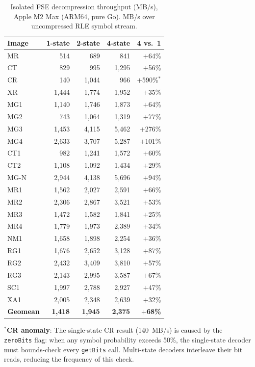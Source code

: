 \documentclass[journal]{IEEEtran}
\begin{document}
\begin{table}[htbp]
\centering
\caption{Isolated FSE decompression throughput (MB/s), Apple M2 Max (ARM64,
pure Go). MB/s over uncompressed RLE symbol stream.}
\label{tab:fse-arm64}
\scriptsize
\begin{tabular}{lrrrr}
\toprule
Image & 1-state & 2-state & 4-state & 4 vs.\ 1 \\
\midrule
MR   &   514 &   689 &   841 & $+$64\% \\
CT   &   829 &   995 & 1,295 & $+$56\% \\
CR   &   140 & 1,044 &   966 & $+$590\%$^*$ \\
XR   & 1,444 & 1,774 & 1,952 & $+$35\% \\
MG1  & 1,140 & 1,746 & 1,873 & $+$64\% \\
MG2  &   743 & 1,064 & 1,319 & $+$77\% \\
MG3  & 1,453 & 4,115 & 5,462 & $+$276\% \\
MG4  & 2,633 & 3,707 & 5,287 & $+$101\% \\
CT1  &   982 & 1,241 & 1,572 & $+$60\% \\
CT2  & 1,108 & 1,092 & 1,434 & $+$29\% \\
MG-N & 2,944 & 4,138 & 5,696 & $+$94\% \\
MR1  & 1,562 & 2,027 & 2,591 & $+$66\% \\
MR2  & 2,306 & 2,867 & 3,521 & $+$53\% \\
MR3  & 1,472 & 1,582 & 1,841 & $+$25\% \\
MR4  & 1,779 & 1,973 & 2,389 & $+$34\% \\
NM1  & 1,658 & 1,898 & 2,254 & $+$36\% \\
RG1  & 1,676 & 2,652 & 3,128 & $+$87\% \\
RG2  & 2,432 & 3,409 & 3,810 & $+$57\% \\
RG3  & 2,143 & 2,995 & 3,587 & $+$67\% \\
SC1  & 1,997 & 2,788 & 2,927 & $+$47\% \\
XA1  & 2,005 & 2,348 & 2,639 & $+$32\% \\
\midrule
\textbf{Geomean} & \textbf{1,418} & \textbf{1,945} & \textbf{2,375} & \textbf{$+$68\%} \\
\bottomrule
\end{tabular}
\end{table}

$^*$\textbf{CR anomaly}: The single-state CR result (140~MB/s) is caused by the
\texttt{zeroBits} flag: when any symbol probability exceeds 50\%, the
single-state decoder must bounds-check every \texttt{getBits} call. Multi-state
decoders interleave their bit reads, reducing the frequency of this check.
\end{document}
